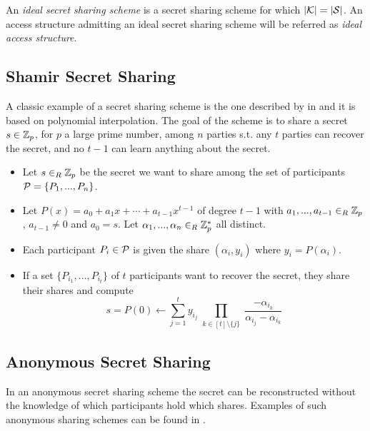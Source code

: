  An \textit{ideal secret sharing scheme} is a secret sharing scheme for which $\vert \mathcal{K} \vert = \vert \mathcal{S} \vert$. An access structure admitting an ideal secret sharing scheme will be referred as \textit{ideal access structure}.


\subsection{Shamir Secret Sharing}
A classic example of a secret sharing scheme is the one described by \citeauthor{Sham79} in \cite{Sham79} and it is based on polynomial interpolation. The goal of the scheme is to share a secret $s \in {\mathbb Z}_p$, for $p$ a large prime number, among $n$ parties s.t. any $t$ parties can recover the secret, and no $t-1$ can learn anything about the secret.

\begin{itemize}[align = left, leftmargin=*, label={--}]
\item Let $s \in_R {\mathbb Z}_p$ be the secret we want to share among the set of participants ${\mathcal P} = \{P_1, ... , P_n \}$.
\item Let $P(x) = a_0 + a_1 x + \cdots + a_{t-1} x^{t-1}$ of degree $t-1$ with $a_1, ..., a_{t-1} \in_R {\mathbb Z}_p$, $a_{t-1} \neq 0$ and $a_0 = s$. Let $\alpha_1, ... , \alpha_n \in_R {\mathbb Z}_p^\ast$ all distinct.
\item Each participant $P_i \in {\mathcal P}$ is given the share $(\alpha_i, y_i)$ where $y_i = P(\alpha_i)$.
\item If a set $\{P_{i_1},...,P_{i_t}\}$ of $t$ participants want to recover the secret, they share their shares and compute
$$ s = P(0) \leftarrow \sum_{j=1}^t y_{i_j} \prod_{\substack{k \in [t] \setminus \{j\}}} \frac{-\alpha_{i_k}}{\alpha_{i_j}-\alpha_{i_k}}$$
\end{itemize}

\subsection{Anonymous Secret Sharing}
In an anonymous secret sharing scheme the secret can be reconstructed without the knowledge of which participants hold which shares. Examples of such anonymous sharing schemes can be found in \cite{BlSt97}.

